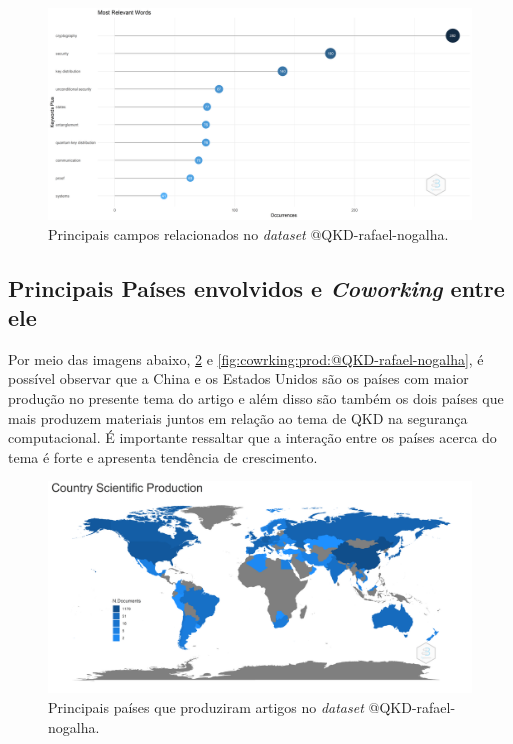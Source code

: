 \begin{figure}[H]
    \centering
    \includegraphics[width=1\textwidth]{experiments/rafaelnogalha/PesquisaBibliografica/QKDSegurancaComputacional/images/palavras_relevantes.png}
    \caption{Principais campos relacionados no \textit{dataset} @QKD-rafael-nogalha.}
    \label{fig:campos:plot:@QKD-rafael-nogalha}
\end{figure}



\subsection{Principais Países envolvidos e \textit{Coworking} entre ele}

Por meio das imagens abaixo, \ref{fig:map:prod:@QKD-rafael-nogalha} e \ref{fig:cowrking:prod:@QKD-rafael-nogalha}, é possível observar que a China e os Estados Unidos são os países com maior produção no presente tema do artigo e além disso são também os dois países que mais produzem materiais juntos em relação ao tema de QKD na segurança computacional. É importante ressaltar que a interação entre os países acerca do tema é forte e apresenta tendência de crescimento.

\begin{figure}[H]
    \centering
    \includegraphics[width=1\textwidth]{experiments/rafaelnogalha/PesquisaBibliografica/QKDSegurancaComputacional/images/especificacao_paises_producao.png}
    \caption{Principais países que produziram artigos no \textit{dataset} @QKD-rafael-nogalha.}
    \label{fig:map:prod:@QKD-rafael-nogalha}
\end{figure}

